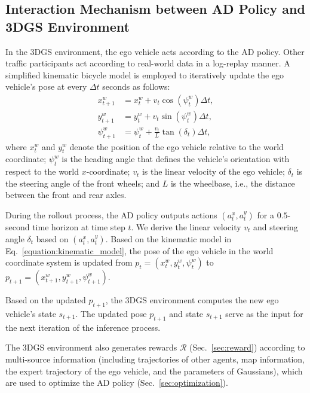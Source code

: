 \subsection{Interaction Mechanism between AD Policy and 3DGS Environment}
In the 3DGS environment, the ego vehicle acts according to the AD policy. Other traffic participants act according to real-world data in a log-replay manner.  
A simplified kinematic bicycle model is employed to iteratively update the ego vehicle's pose at every $\Delta t$ seconds as follows:  
\begin{equation}
\begin{aligned}
x_{t+1}^{w} & = x_{t}^w + v_t \cos \left(\psi_{t}^w\right) \Delta t, \\
y_{t+1}^{w} & = y_{t}^w + v_t \sin \left(\psi_{t}^w\right) \Delta t, \\
\psi_{t+1}^{w} & = \psi_{t}^w + \frac{v_t}{L} \tan \left(\delta_t\right) \Delta t,
\label{equation:kinematic_model}
\end{aligned}
\end{equation}  
where $x_t^{w}$ and $y_t^{w}$ denote the position of the ego vehicle relative to the world coordinate; $\psi_t^w$ is the heading angle that defines the vehicle's orientation with respect to the world $x$-coordinate; $v_t$ is the linear velocity of the ego vehicle; $\delta_t$ is the steering angle of the front wheels; and $L$ is the wheelbase, i.e., the distance between the front and rear axles.

During the rollout process, the AD policy outputs actions $(a_t^x, a_t^y)$ for a $0.5$-second time horizon at time step $t$. We derive the linear velocity $v_t$ and steering angle $\delta_t$ based on $(a_t^x, a_t^y)$.  
Based on the kinematic model in Eq.~\ref{equation:kinematic_model},  
the pose of the ego vehicle in the world coordinate system is updated from ${p}_t = (x_{t}^w, y_{t}^w, \psi_{t}^w)$ to ${p}_{t+1} = (x_{t+1}^{w}, y_{t+1}^{w}, \psi_{t+1}^{w})$.  

Based on the updated ${p}_{t+1}$, the 3DGS environment computes the new ego vehicle's state $s_{t+1}$. The updated pose ${p}_{t+1}$ and state $s_{t+1}$ serve as the input for the next iteration of the inference process.

The 3DGS environment also generates rewards $\mathcal{R}$ (Sec.~\ref{sec:reward}) according to multi-source information (including trajectories of other agents, map information, the expert trajectory of the ego vehicle, and the parameters of Gaussians), which are used to optimize the AD policy (Sec.~\ref{sec:optimization}).

